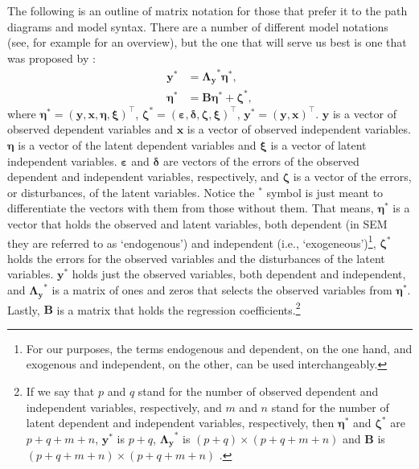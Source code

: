 \documentclass[]{interact}
\theoremstyle{plain}%
\theoremstyle{definition}
\theoremstyle{remark}
\begin{document}
The following is an outline of matrix notation for those that prefer it
to the path diagrams and model syntax. There are a number of different
model notations (see, for example \citet{Bollen1989} for an overview),
but the one that will serve us best is one that was proposed by
\citet{Graff1979}: \begin{align}
\bm{y}^{*} & = \bm{\Lambda_{y}}^{*} \bm{\eta}^{*}, \\
\bm{\eta}^{*} & = \bm{B}\bm{\eta}^{*} + \bm{\zeta}^{*}, 
\end{align} where
\(\bm{\eta}^{*} = (\bm{y}, \bm{x}, \bm{\eta}, \bm{\xi})^{\intercal}\),
\(\bm{\zeta}^{*} = (\bm{\varepsilon}, \bm{\delta}, \bm{\zeta}, \bm{\xi})^{\intercal}\),
\(\bm{y}^{*} = (\bm{y}, \bm{x})^{\intercal}\). \(\bm{y}\) is a vector of
observed dependent variables and \(\bm{x}\) is a vector of observed
independent variables. \(\bm{\eta}\) is a vector of the latent dependent
variables and \(\bm{\xi}\) is a vector of latent independent variables.
\(\bm{\varepsilon}\) and \(\bm{\delta}\) are vectors of the errors of
the observed dependent and independent variables, respectively, and
\(\bm{\zeta}\) is a vector of the errors, or disturbances, of the latent
variables. Notice the \(^{*}\) symbol is just meant to differentiate the
vectors with them from those without them. That means, \(\bm{\eta}^{*}\)
is a vector that holds the observed and latent variables, both dependent
(in SEM they are referred to as `endogenous') and independent (i.e.,
`exogeneous')\footnote{For our purposes, the terms endogenous and
  dependent, on the one hand, and exogenous and independent, on the
  other, can be used interchangeably.}, \(\bm{\zeta}^{*}\) holds the
errors for the observed variables and the disturbances of the latent
variables. \(\bm{y}^{*}\) holds just the observed variables, both
dependent and independent, and \(\bm{\Lambda_{y}}^{*}\) is a matrix of
ones and zeros that selects the observed variables from
\(\bm{\eta}^{*}\). Lastly, \(\bm{B}\) is a matrix that holds the
regression coefficients.\footnote{If we say that \(p\) and \(q\) stand
  for the number of observed dependent and independent variables,
  respectively, and \(m\) and \(n\) stand for the number of latent
  dependent and independent variables, respectively, then
  \(\bm{\eta}^{*}\) and \(\bm{\zeta}^{*}\) are \(p + q + m + n\),
  \(\bm{y}^{*}\) is \(p + q\), \(\bm{\Lambda_{y}}^{*}\) is
  \((p + q) \times (p + q + m + n)\) and \(\bm{B}\) is
  \((p + q + m + n) \times (p + q + m + n)\) \citep{Bollen1989}.}
\end{document}
